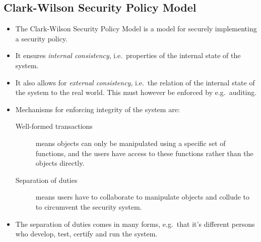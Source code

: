 \documentclass{beamer}
\begin{document}
\subsection{Clark-Wilson Security Policy Model}

\begin{frame}{\insertsubsectionhead}
  \begin{itemize}
    \item The Clark-Wilson Security Policy Model is a model for securely 
      implementing a security policy.

    \item It ensures \emph{internal consistency}, i.e.\ properties of the 
      internal state of the system.

    \item It also allows for \emph{external consistency}, i.e.\ the relation of 
      the internal state of the system to the real world.
      This must however be enforced by e.g.\ auditing.
  \end{itemize}
\end{frame}

\begin{frame}{\insertsubsectionhead}
  \begin{itemize}
    \item Mechanisms for enforcing integrity of the system are:
      \begin{description}
        \item[Well-formed transactions] means objects can only be manipulated 
          using a specific set of functions, and the users have access to these 
          functions rather than the objects directly.

        \item[Separation of duties] means users have to collaborate to 
          manipulate objects and collude to to circumvent the security system.
      \end{description}

    \item The separation of duties comes in many forms, e.g.\ that it's 
      different persons who develop, test, certify and run the system.

  \end{itemize}
\end{frame}
\end{document}
